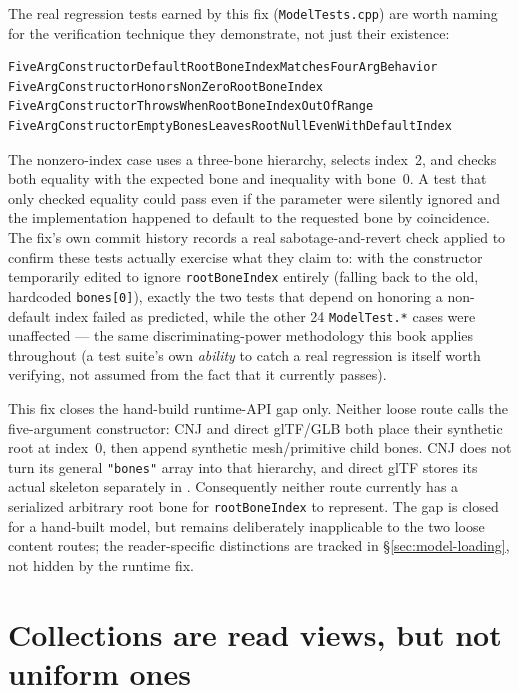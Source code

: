 The real regression tests earned by this fix (\texttt{ModelTests.cpp}) are worth naming for the
verification technique they demonstrate, not just their existence:

\begin{lstlisting}
FiveArgConstructorDefaultRootBoneIndexMatchesFourArgBehavior
FiveArgConstructorHonorsNonZeroRootBoneIndex
FiveArgConstructorThrowsWhenRootBoneIndexOutOfRange
FiveArgConstructorEmptyBonesLeavesRootNullEvenWithDefaultIndex
\end{lstlisting}

The nonzero-index case uses a three-bone hierarchy, selects index~2, and checks both equality
with the expected bone and inequality with bone~0. A test that only checked equality could pass
even if the parameter were silently ignored and the implementation happened to default to the
requested bone by coincidence. The fix's own commit history records a real sabotage-and-revert
check applied to confirm these tests actually exercise what they claim to: with the constructor
temporarily edited to ignore \texttt{rootBoneIndex} entirely (falling back to the old, hardcoded
\texttt{bones[0]}), exactly the two tests that depend on honoring a non-default index failed as
predicted, while the other 24 \texttt{ModelTest.*} cases were unaffected --- the same
discriminating-power methodology this book applies throughout (a test suite's own
\emph{ability} to catch a real regression is itself worth verifying, not assumed from the fact
that it currently passes).

This fix closes the hand-build runtime-API gap only. Neither loose route calls the five-argument
constructor: CNJ and direct glTF/GLB both place their synthetic root at index~0, then append
synthetic mesh/primitive child bones. CNJ does not turn its general \texttt{"bones"} array into
that  hierarchy, and direct glTF stores its actual skeleton separately in
. Consequently neither route currently has a serialized arbitrary root
bone for \texttt{rootBoneIndex} to represent. The gap is closed for a hand-built model, but
remains deliberately inapplicable to the two loose content routes; the reader-specific
distinctions are tracked in \S\ref{sec:model-loading}, not hidden by the runtime fix.

\section{Collections are read views, but not uniform ones}
\label{sec:model-collections-contract}

